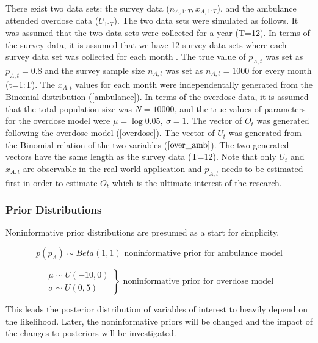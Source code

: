 \documentclass[12pt]{article}
\begin{document}
{\normalsize 
There exist two data sets: the survey data ($n_{A,1:T}, x_{A,1:T}$), and the ambulance attended overdose data ($U_{1:T}$). The two data sets were simulated as follows. It was assumed that the two data sets were collected for a year (T=12). In terms of the survey data, it is assumed that  we have 12 survey data sets where each survey data set was collected for each month . The true value of $p_{A,t}$ was set as $p_{A,t}=0.8$ and the survey sample size $n_{A,t}$ was set as $n_{A,t}=1000$ for every month (t=1:T). The $x_{A,t}$ values for each month were independentally generated from the Binomial distribution (\ref{ambulance}).  
In terms of the overdose data, it is assumed that the total population size was $N = 10000$, and the true values of parameters for the overdose model were $\mu=\log0.05,\ \sigma=1$.
The vector of $O_t$ was generated following the overdose model (\ref{overdose}). The vector of $U_t$ was generated from the Binomial relation of the two variables ($\ref{over_amb}$). The two generated vectors have the same length as the survey data (T=12).  Note that only $U_t$ and $x_{A,t}$ are observable in the real-world application and $p_{A,t}$ needs to be estimated first in order to estimate $O_t$ which is the ultimate interest of the research.\\


\subsubsection{Prior Distributions}
\normalsize Noninformative prior distributions are presumed as a start for simplicity. 

\begin{equation}
\label{nonin_prior_amb}
p(p_A) \sim Beta(1,1)
\text{			noninformative prior for ambulance model}
\end{equation} 

\begin{equation}
\label{noninprior_over}
\left.\begin{aligned}
\mu \sim U(-10,0)\\
\sigma \sim U(0,5)
\end{aligned}\right\} 
\text{			noninformative prior for overdose model}
\end{equation}

This leads the posterior distribution of variables of interest to heavily depend on the likelihood. Later, the noninformative priors will be changed and the impact of the changes to posteriors will be investigated. 

}
\end{document}
